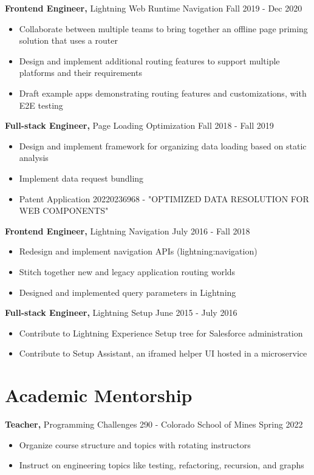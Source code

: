 \documentclass[12pt]{res}
\begin{document}
\begin{resume}
{\bf Frontend Engineer,} Lightning Web Runtime Navigation \hfill Fall 2019 - Dec 2020
\begin{itemize} \itemsep -2pt
    \item Collaborate between multiple teams to bring together an offline page priming solution that uses a router
    \item Design and implement additional routing features to support multiple platforms and their requirements
    \item Draft example apps demonstrating routing features and customizations, with E2E testing
\end{itemize}

{\bf Full-stack Engineer,} Page Loading Optimization \hfill Fall 2018 - Fall 2019
\begin{itemize} \itemsep -2pt
    \item Design and implement framework for organizing data loading based on static analysis
    \item Implement data request bundling
    \item Patent Application 20220236968 - "OPTIMIZED DATA RESOLUTION FOR WEB COMPONENTS"
\end{itemize}

{\bf Frontend Engineer,} Lightning Navigation \hfill July 2016 - Fall 2018
\begin{itemize} \itemsep -2pt
    \item Redesign and implement navigation APIs (lightning:navigation)
    \item Stitch together new and legacy application routing worlds
    \item Designed and implemented query parameters in Lightning
\end{itemize}

{\bf Full-stack Engineer,} Lightning Setup \hfill June 2015 - July 2016
\begin{itemize} \itemsep -2pt
    \item Contribute to Lightning Experience Setup tree for Salesforce administration
    \item Contribute to Setup Assistant, an iframed helper UI hosted in a microservice
\end{itemize}

\section{Academic Mentorship}

{\bf Teacher,} Programming Challenges 290 - Colorado School of Mines \hfill Spring 2022
\begin{itemize} \itemsep -2pt
    \item Organize course structure and topics with rotating instructors
    \item Instruct on engineering topics like testing, refactoring, recursion, and graphs
\end{itemize}


\end{resume}
\end{document}
